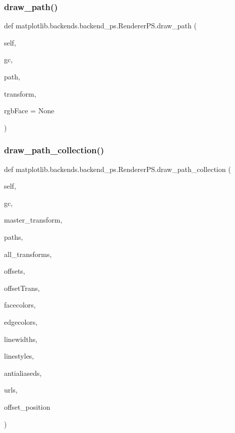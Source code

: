 \subsubsection{\texorpdfstring{draw\+\_\+path()}{draw\_path()}}
{\footnotesize\ttfamily def matplotlib.\+backends.\+backend\+\_\+ps.\+Renderer\+P\+S.\+draw\+\_\+path (\begin{DoxyParamCaption}\item[{}]{self,  }\item[{}]{gc,  }\item[{}]{path,  }\item[{}]{transform,  }\item[{}]{rgb\+Face = {\ttfamily None} }\end{DoxyParamCaption})}

\mbox{\label{classmatplotlib_1_1backends_1_1backend__ps_1_1RendererPS_ad7c4df9e5eecc9cbd82d5d505082e776}} 
\subsubsection{\texorpdfstring{draw\+\_\+path\+\_\+collection()}{draw\_path\_collection()}}
{\footnotesize\ttfamily def matplotlib.\+backends.\+backend\+\_\+ps.\+Renderer\+P\+S.\+draw\+\_\+path\+\_\+collection (\begin{DoxyParamCaption}\item[{}]{self,  }\item[{}]{gc,  }\item[{}]{master\+\_\+transform,  }\item[{}]{paths,  }\item[{}]{all\+\_\+transforms,  }\item[{}]{offsets,  }\item[{}]{offset\+Trans,  }\item[{}]{facecolors,  }\item[{}]{edgecolors,  }\item[{}]{linewidths,  }\item[{}]{linestyles,  }\item[{}]{antialiaseds,  }\item[{}]{urls,  }\item[{}]{offset\+\_\+position }\end{DoxyParamCaption})}

